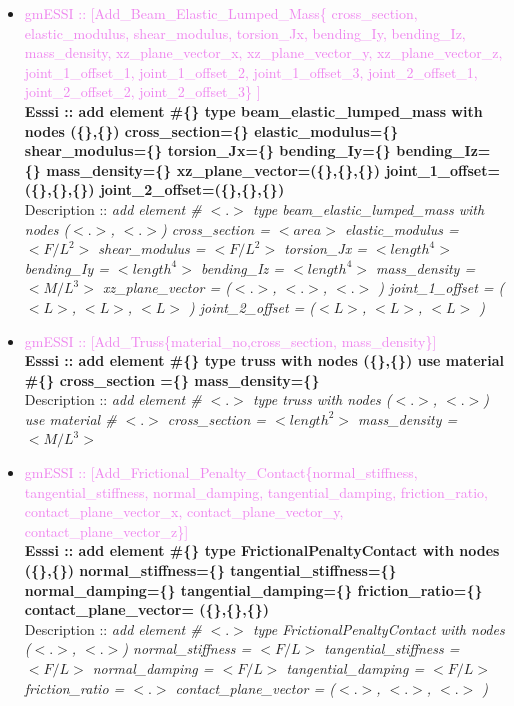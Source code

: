 \documentclass[11pt]{article}
\begin{document}
  \begin{itemize}

    \item \textcolor{violet}{gmESSI :: [Add\_Beam\_Elastic\_Lumped\_Mass\{ cross\_section, elastic\_modulus, shear\_modulus, torsion\_Jx, bending\_Iy, bending\_Iz, mass\_density, xz\_plane\_vector\_x, xz\_plane\_vector\_y, xz\_plane\_vector\_z, joint\_1\_offset\_1, joint\_1\_offset\_2, joint\_1\_offset\_3, joint\_2\_offset\_1, joint\_2\_offset\_2, joint\_2\_offset\_3\} ]} \\             
    \textbf{Esssi :: add element \#\{\} type beam\_elastic\_lumped\_mass with nodes (\{\},\{\}) cross\_section=\{\} elastic\_modulus=\{\} shear\_modulus=\{\} torsion\_Jx=\{\} bending\_Iy=\{\} bending\_Iz=\{\} mass\_density=\{\}  xz\_plane\_vector=(\{\},\{\},\{\}) joint\_1\_offset=(\{\},\{\},\{\}) joint\_2\_offset=(\{\},\{\},\{\})}\\
    Description :: \textit{ add element \# $<.>$ type beam\_elastic\_lumped\_mass with nodes ($<.>$, $<.>$) cross\_section = $<area>$ elastic\_modulus = $<F/L^2>$ shear\_modulus = $<F/L^2>$ torsion\_Jx = $<length^4>$ bending\_Iy = $<length^4>$ bending\_Iz = $<length^4>$ mass\_density = $<M/L^3>$  xz\_plane\_vector = ($<.>$, $<.>$, $<.>$ ) joint\_1\_offset = ($<L>$, $<L>$, $<L>$ ) joint\_2\_offset = ($<L>$, $<L>$, $<L>$ )}

    \item \textcolor{violet}{gmESSI :: [Add\_Truss\{material\_no,cross\_section, mass\_density\}]} \\             
    \textbf{Esssi :: add element \#\{\} type truss with nodes (\{\},\{\}) use material \#\{\} cross\_section =\{\} mass\_density=\{\}}\\
    Description :: \textit{ add element \# $<.>$ type truss with nodes ($<.>$, $<.>$) use material \# $<.>$ cross\_section = $<length^2>$ mass\_density = $<M/L^3>$ }

    \item \textcolor{violet}{gmESSI :: [Add\_Frictional\_Penalty\_Contact\{normal\_stiffness, tangential\_stiffness, normal\_damping, tangential\_damping, friction\_ratio, contact\_plane\_vector\_x, contact\_plane\_vector\_y, contact\_plane\_vector\_z\}]} \\             
    \textbf{Esssi :: add element \#\{\} type FrictionalPenaltyContact with nodes (\{\},\{\}) normal\_stiffness=\{\} tangential\_stiffness=\{\}  normal\_damping=\{\} tangential\_damping=\{\} friction\_ratio=\{\} contact\_plane\_vector= (\{\},\{\},\{\})}\\
    Description :: \textit{ add element \# $<.>$ type FrictionalPenaltyContact with nodes ($<.>$, $<.>$) normal\_stiffness = $<F/L>$ tangential\_stiffness = $<F/L>$  normal\_damping = $<F/L>$ tangential\_damping = $<F/L>$  friction\_ratio = $<.>$ contact\_plane\_vector = ($<.>$, $<.>$, $<.>$ )}


\end{itemize}
\end{document}
